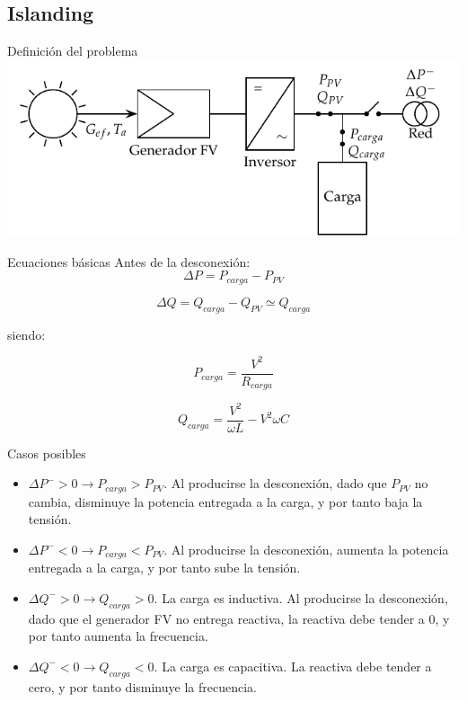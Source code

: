 \documentclass[xcolor={usenames,svgnames,dvipsnames}]{beamer}
\begin{document}
\subsection{Islanding}
\label{sec-2-6}
\begin{frame}[label=sec-2-6-1]{Definición del problema}
\includegraphics[width=.9\linewidth]{../figs/Isla.pdf}
\end{frame}

\begin{frame}[label=sec-2-6-2]{Ecuaciones básicas}
Antes de la desconexión:$$\Delta P=P_{carga}-P_{PV}$$

$$\Delta Q=Q_{carga}-Q_{PV}\simeq Q_{carga}$$

siendo:

$$P_{carga}=\frac{V^{2}}{R_{carga}}$$

$$Q_{carga}=\frac{V^{2}}{\omega L}-V^{2}\omega C$$
\end{frame}

\begin{frame}[label=sec-2-6-3]{Casos posibles}
\begin{itemize}
\item $\Delta P^{-}>0\rightarrow P_{carga}>P_{PV}$. Al producirse la
desconexión, dado que $P_{PV}$ no cambia, disminuye la potencia
entregada a la carga, y por tanto baja la tensión.

\item $\Delta P^{-}<0\rightarrow P_{carga}<P_{PV}$. Al producirse la
desconexión, aumenta la potencia entregada a la carga, y por tanto
sube la tensión.

\item $\Delta Q^{-}>0\rightarrow Q_{carga}>0$. La carga es inductiva. Al
producirse la desconexión, dado que el generador FV no entrega
reactiva, la reactiva debe tender a 0, y por tanto aumenta la
frecuencia.

\item $\Delta Q^{-}<0\rightarrow Q_{carga}<0$. La carga es capacitiva. La
reactiva debe tender a cero, y por tanto disminuye la frecuencia.
\end{itemize}
\end{frame}
\end{document}
